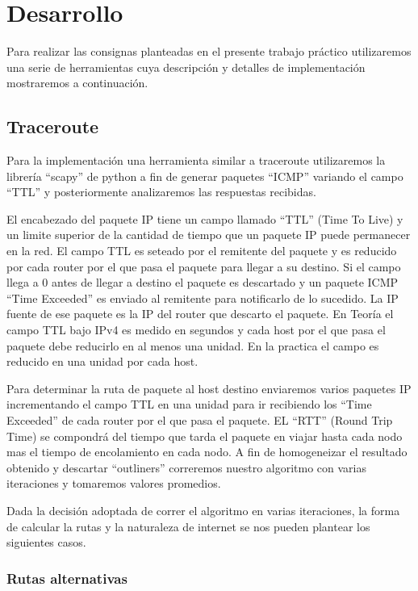 \section{Desarrollo} 
Para realizar las consignas planteadas en el presente trabajo práctico utilizaremos una serie de herramientas cuya descripción y detalles de implementación mostraremos a continuación.

\subsection{Traceroute}
Para la implementación una herramienta similar a traceroute utilizaremos la librería ``scapy'' de python a fin de generar paquetes ``ICMP'' variando el campo ``TTL'' y posteriormente analizaremos las respuestas recibidas.
 
El encabezado del paquete IP tiene un campo llamado ``TTL'' (Time To Live) y un limite superior de la cantidad de tiempo que un paquete IP puede permanecer en la red.
El campo TTL es seteado por el remitente del paquete y es reducido por cada router por el que pasa el paquete para llegar a su destino. Si el campo llega a 0 antes de llegar a destino el paquete es descartado y un paquete ICMP ``Time Exceeded'' es enviado al remitente para notificarlo de lo sucedido. La IP fuente de ese paquete es la IP del router que descarto el paquete.
En Teoría el campo TTL bajo IPv4 es medido en segundos y cada host por el que pasa el paquete debe reducirlo en al menos una unidad. En la practica el campo es reducido en una unidad por cada host.

Para determinar la ruta de paquete al host destino enviaremos varios paquetes IP incrementando el campo TTL en una unidad para ir recibiendo los ``Time Exceeded'' de cada router por el que pasa el paquete. EL ``RTT'' (Round Trip Time) se compondrá del tiempo que tarda el paquete en viajar hasta cada nodo mas el tiempo de encolamiento en cada nodo. A fin de homogeneizar el resultado obtenido y descartar ``outliners'' correremos nuestro algoritmo con varias iteraciones y tomaremos valores promedios.

Dada la decisión adoptada de correr el algoritmo en varias iteraciones, la forma de calcular la rutas y la naturaleza de internet se nos pueden plantear los siguientes casos.

\subsubsection{Rutas alternativas}

